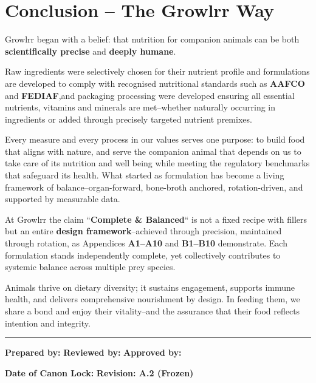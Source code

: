 
\section*{Conclusion -- The Growlrr Way}

Growlrr began with a belief: that nutrition for companion animals can be both \textbf{scientifically precise} and \textbf{deeply humane}.

Raw ingredients were selectively chosen for their nutrient profile and formulations are developed to comply with recognised nutritional standards such as \textbf{AAFCO} and \textbf{FEDIAF},and packaging processing were developed ensuring all essential nutrients, vitamins and minerals are met--whether naturally occurring in ingredients or added through precisely targeted nutrient premixes.

Every measure and every process in our values serves one purpose: to build food that aligns with nature, and serve the companion animal that depends on us to take care of its nutrition and well being while meeting the regulatory benchmarks that safeguard its health. What started as formulation has become a living framework of balance--organ-forward, bone-broth anchored, rotation-driven, and supported by measurable data.

At Growlrr the claim ``\textbf{Complete \& Balanced}`` is not a fixed recipe with fillers but an entire \textbf{design framework}--achieved through precision, maintained through rotation, as Appendices \textbf{A1--A10} and \textbf{B1--B10} demonstrate. Each formulation stands independently complete, yet collectively contributes to systemic balance across multiple prey species.

Animals thrive on dietary diversity; it sustains engagement, supports immune health, and delivers comprehensive nourishment by design. In feeding them, we share a bond and enjoy their vitality--and the assurance that their food reflects intention and integrity.

\vspace{5mm}
\noindent\rule{\linewidth}{0.4pt}

\vspace{2mm}
\noindent
\textbf{Prepared by:} \underline{\hspace{4cm}} \quad
\textbf{Reviewed by:} \underline{\hspace{4cm}} \quad
\textbf{Approved by:} \underline{\hspace{4cm}}

\vspace{2mm}
\noindent
\textbf{Date of Canon Lock:} \underline{\hspace{3cm}} \quad
\textbf{Revision: A.2 (Frozen)}